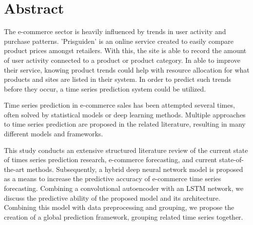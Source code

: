 \section*{Abstract}
\label{section:Abstract}

The e-commerce sector is heavily influenced by trends in user activity and purchase patterns.
'Prisguiden' is an online service created to easily compare product prices amongst retailers.
With this, the site is able to record the amount of user activity connected to a product or product category.
In able to improve their service, knowing product trends could help with resource allocation for what products and sites are listed in their system.
In order to predict such trends before they occur, a time series prediction system could be utilized.

Time series prediction in e-commerce sales has been attempted several times,
often solved by statistical models or deep learning methods.
Multiple approaches to time series prediction are proposed in the related literature,
resulting in many different models and frameworks.

This study conducts an extensive structured literature review of the current state of times series prediction research, e-commerce forecasting,
and current state-of-the-art methods.
Subsequently, a hybrid deep neural network model is proposed as a means to increase the predictive accuracy of e-commerce time series forecasting.
Combining a convolutional autoencoder with an LSTM network, we discuss the predictive ability of the proposed model
and its architecture.
Combining this model with data preprocessing and grouping, we propose the creation of a global prediction framework,
grouping related time series together.




\iffalse
This paper provides a template for writing AI project rapports for either the AI specialization project; masters "datateknikk" or masters "informatikk". The use of the template is recommended and is written in english as we encourage students to submit their project and masters theses in English.
The template does not form a compulsory style that you are obliged to use. However, the format and contents are a result of a joint AI group initiative thus providing a common starting point for all AI students. For a given project tuning of the template may still be required. Such tuning might involve moving a chapter to a section or vice versa due to the nature of the project.

The abstract is your sales pitch which encourages people to read your work but unlike sales it should be realistic with respect to the contributions of the work. It should include:
\begin{itemize}
    \item the field of research
    \item a brief motivation for the work
    \item what the research topic is and
    \item the research approach(es) applied.
    \item contributions
\end{itemize}

The abstract length should be roughly half a page of text --- without lists, tables or figures.
\fi
